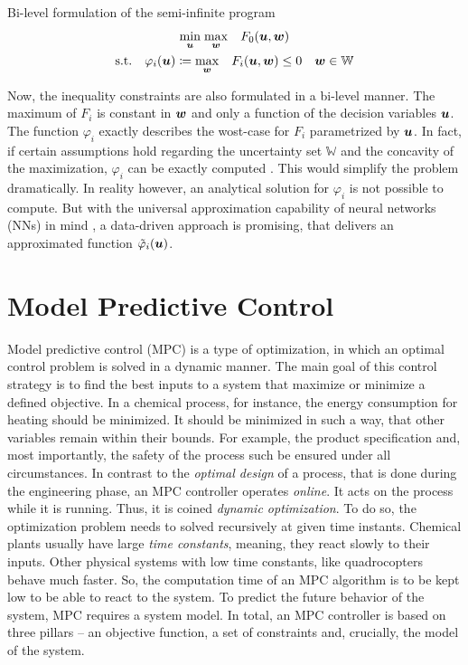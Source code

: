 \begin{definition} Bi-level formulation of the semi-infinite program
    \label{theroy:def: bi-level program}
    \[
    \begin{gathered}
        \underset{{\bm{u}}}{\min} \; \underset{{\bm{w}}}{\max} \quad F_0({\bm{u}}, {\bm{w}}) \\
        \text{s.t.} \quad \varphi_i({\bm{u}}) \coloneq \underset{{\bm{w}}}{\max} \quad F_i({\bm{u}}, {\bm{w}}) \leq 0
        \quad {\bm{w}} \in \mathbb{W}
    \end{gathered}
    \]
\end{definition}

Now, the inequality constraints are also formulated in a bi-level manner. The maximum of $F_i$ is 
constant in ${\bm{w}}$ and only a function of the decision variables ${\bm{u}}$. The function $\varphi_i$
exactly describes the wost-case for $F_i$ parametrized by ${\bm{u}}$. In fact, if certain assumptions hold
regarding the uncertainty set $\mathbb{W}$ and the concavity of the maximization,
$\varphi_i$ can be exactly computed \cite{empty000}. This would simplify the problem dramatically.
In reality however, an analytical solution for $\varphi_i$ is not possible to compute.
But with the universal approximation capability of neural networks (NNs) in mind \cite{hornik1990}, 
a data-driven approach is promising, that delivers an approximated function $\tilde{\varphi}_i({\bm{u}})$.


\section{Model Predictive Control}

Model predictive control (MPC) is a type of optimization, in which an optimal control problem is solved
in a dynamic manner. The main goal of this control strategy is to find the best inputs to a system that
maximize or minimize a defined objective. In a chemical process, for instance, the energy consumption
for heating should be minimized. It should be minimized in such a way, that other variables remain 
within their bounds. For example, the product specification and, most importantly, the safety of the process
such be ensured under all circumstances. In contrast to the \emph{optimal design} of a process, that 
is done during the engineering phase, an MPC controller operates \emph{online}. It acts on the process
while it is running. Thus, it is coined \emph{dynamic optimization}. To do so, the optimization
problem needs to solved recursively at given time instants.
Chemical plants usually have
large \emph{time constants}, meaning, they react slowly to their inputs.
Other physical systems with low time constants, like quadrocopters behave much faster. So, the
computation time of an MPC algorithm is to be kept low \cite{salzmann2023} to be able to react to the system.
To predict the future behavior of the system, MPC requires a system model.
\newline
\newline
In total, an MPC controller is based on three pillars – an objective function, a set of constraints and, crucially,
the model of the system.

